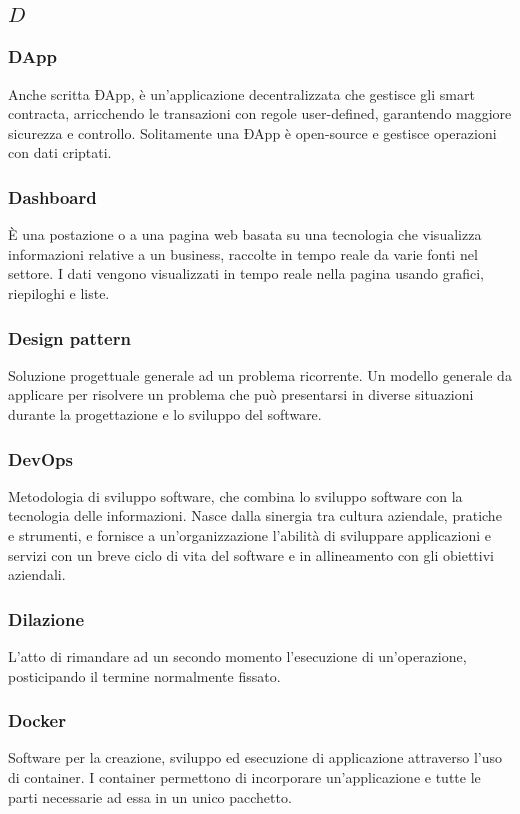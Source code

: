 \subsection*{\quad$D\quad$}
\subsubsection*{DApp}
Anche scritta ÐApp, è un'applicazione decentralizzata che gestisce gli smart contracta\glo, arricchendo le transazioni con regole user-defined, garantendo maggiore sicurezza e controllo. Solitamente una ÐApp è open-source e  gestisce operazioni con dati criptati.

\subsubsection*{Dashboard}
È una postazione o a una pagina web basata su una tecnologia che visualizza informazioni relative a un business, raccolte in tempo reale da varie fonti nel settore. I dati vengono visualizzati in tempo reale nella pagina usando grafici, riepiloghi e liste.

\subsubsection*{Design pattern}
Soluzione progettuale generale ad un problema ricorrente. Un modello generale da applicare per risolvere un problema che può presentarsi in diverse situazioni durante la progettazione e lo sviluppo del software.

\subsubsection*{DevOps}
Metodologia di sviluppo software, che combina lo sviluppo software con la tecnologia delle informazioni. Nasce dalla sinergia tra cultura aziendale, pratiche e strumenti, e fornisce a un'organizzazione l'abilità di sviluppare applicazioni e servizi con un breve ciclo di vita del software e in allineamento con gli obiettivi aziendali.

\subsubsection*{Dilazione}
L'atto di rimandare ad un secondo momento l'esecuzione di un'operazione, posticipando il termine normalmente fissato.

\subsubsection*{Docker}
Software per la creazione, sviluppo ed esecuzione di applicazione attraverso l’uso di container. I container
permettono di incorporare un’applicazione e tutte le parti necessarie ad essa in un unico pacchetto.

